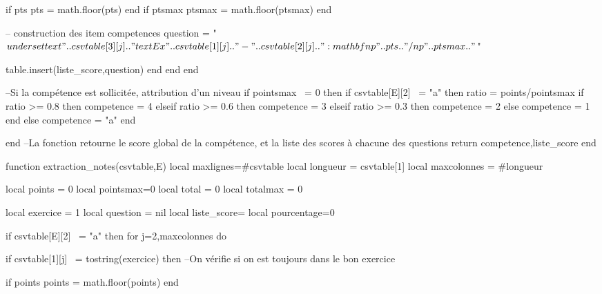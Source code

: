 \documentclass{article}
\begin{document}
\begin{luacode*}
                    if pts%
                        pts = math.floor(pts)
                    end
                    if ptsmax%
                        ptsmax = math.floor(ptsmax)
                    end            
    
                    -- construction des item competences
                    question = "$\\underset{\\text{".. csvtable[3][j] .."}}{\\text{Ex " .. csvtable[1][j] .."-" .. csvtable[2][j] .. "}: \\mathbf{\\np{" .. pts .. "}/\\np{" .. ptsmax .. "}}}$"
    
                    table.insert(liste_score,question)
                end
            end
        end
    
    
        --Si la compétence est sollicitée, attribution d'un niveau
        if pointsmax ~= 0 then
            if csvtable[E][2] ~= "a" then
                ratio = points/pointsmax
                if ratio >= 0.8 then
                    competence = 4
                elseif ratio >= 0.6 then
                    competence = 3
                elseif ratio >= 0.3 then
                    competence = 2
                else
                    competence = 1
                end
            else
                competence = "a"
            end
    
    
        end
        --La fonction retourne le score global de la compétence, et la liste des scores à chacune des questions
        return competence,liste_score
    end
    
    function extraction_notes(csvtable,E)
        local maxlignes=#csvtable
        local longueur = csvtable[1]
        local maxcolonnes = #longueur
    
        local points = 0
        local pointsmax=0
        local total = 0
        local totalmax = 0
    
        local exercice = 1
        local question = nil
        local liste_score={}
        local pourcentage=0
    
        if csvtable[E][2] ~= "a" then
            for j=2,maxcolonnes do
            
                if csvtable[1][j] ~= tostring(exercice) then --On vérifie si on est toujours dans le bon exercice
    
                    if points%
                    points = math.floor(points)
                    end
    

\end{luacode*}
\end{document}
